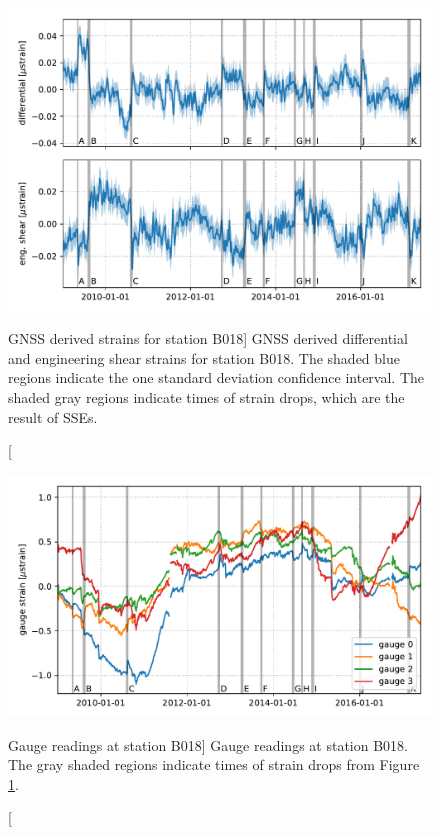 \begin{figure}
\includegraphics{ch6/figures/gnss.pdf}
\caption
[GNSS derived strains for station B018]
{GNSS derived differential and engineering shear strains for
station B018. The shaded blue regions indicate the one standard
deviation confidence interval. The shaded gray regions indicate times
of strain drops, which are the result of SSEs.}
\label{ch6:fig:Gnss}
\end{figure}

\begin{figure}
\includegraphics{ch6/figures/gauge.pdf}
\caption
[Gauge readings at station B018]
{Gauge readings at station B018. The gray shaded regions
indicate times of strain drops from Figure \ref{ch6:fig:Gnss}.}
\label{ch6:fig:Gauge}
\end{figure}

